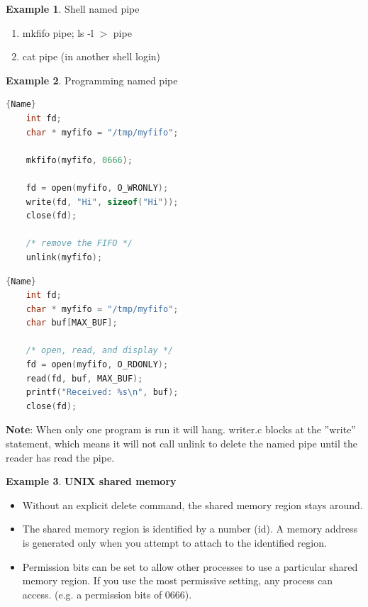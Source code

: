 \documentclass[11pt,a4paper]{article}
\theoremstyle{definition}
\newtheorem{example}{Example}[section]
\newenvironment{myitemize}
{ \begin{itemize}
    \setlength{\itemsep}{5pt}
    \setlength{\parskip}{0pt}
    \setlength{\parsep}{0pt}     }
{ \end{itemize}                  }
\newenvironment{myenumerate}
{ \begin{enumerate}
    \setlength{\itemsep}{5pt}
    \setlength{\parskip}{0pt}
    \setlength{\parsep}{0pt}     }
{ \end{enumerate}                }
\begin{document}
\begin{example}{Shell named pipe}
	\begin{myenumerate}
		\item \textsf{mkfifo pipe; ls -l $>$ pipe}
		\item \textsf{cat pipe} (in another shell login)
	\end{myenumerate}
\end{example}

\begin{example}{Programming named pipe}

\noindent\begin{minipage}{.48\textwidth}
\begin{lstlisting}[caption=writer.c,frame=tlrb,language=C]{Name}
    int fd;
    char * myfifo = "/tmp/myfifo";

    mkfifo(myfifo, 0666);

    fd = open(myfifo, O_WRONLY);
    write(fd, "Hi", sizeof("Hi"));
    close(fd);

    /* remove the FIFO */
    unlink(myfifo);
\end{lstlisting}
\end{minipage}\hfill
\begin{minipage}{.48\textwidth}
\begin{lstlisting}[caption=reader.c,frame=tlrb,language=C]{Name}
    int fd;
    char * myfifo = "/tmp/myfifo";
    char buf[MAX_BUF];

    /* open, read, and display */
    fd = open(myfifo, O_RDONLY);
    read(fd, buf, MAX_BUF);
    printf("Received: %s\n", buf);
    close(fd);

\end{lstlisting}
\end{minipage}
\textbf{Note}: When only one program is run it will hang. writer.c blocks at the ''write'' statement, which means it will not call unlink to delete the named pipe until the reader has read the pipe.

\end{example}

\begin{example}{\textbf{UNIX shared memory}}
	\begin{myitemize}
		\item Without an explicit delete command, the shared memory region stays around.
		\item The shared memory region is identified by a number (id). A memory address is generated only when you attempt to attach to the identified region.
		\item Permission bits can be set to allow other processes to use a particular shared memory region. If you use the most permissive setting, any process can access. (e.g. a permission bits of 0666).
	\end{myitemize}
\end{example}
\end{document}
